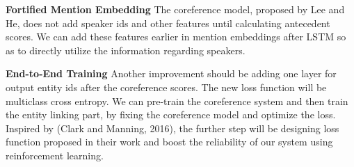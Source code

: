 \documentclass[11pt]{article}
\begin{document}
{\bf Fortified Mention Embedding} 
The coreference model, proposed by Lee and He, does not add speaker ids and other features until calculating antecedent scores. We can add these features earlier in mention embeddings after LSTM so as to directly utilize the information regarding speakers.   

{\bf End-to-End Training}
Another improvement should be adding one layer for output entity ids after the coreference scores. The new loss function will be multiclass cross entropy. We can pre-train the coreference system and then train the entity linking part, by fixing the coreference model and optimize the loss. Inspired by (Clark and Manning, 2016), the further step will be designing loss function proposed in their work and boost the reliability of our system using reinforcement learning.



%
%



\appendix
\end{document}
